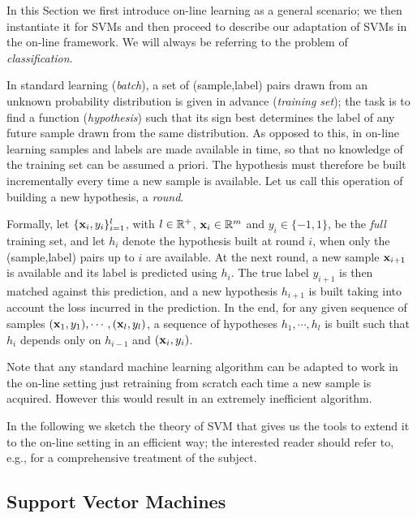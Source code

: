 In this Section we first introduce on-line learning as a general scenario; we then
instantiate it for SVMs and then proceed to describe our
adaptation of SVMs in the on-line framework. We will always be referring
to the problem of \emph{classification}.

In standard learning (\emph{batch}), a set of (sample,label) pairs drawn from an
unknown probability distribution is given in advance (\emph{training set}); the task
is to find a function (\emph{hypothesis}) such that its sign best determines the
label of any future sample drawn from the same distribution. As opposed to this,
in on-line learning samples and labels are made available in time, so that no
knowledge of the training set can be assumed a priori. The hypothesis must therefore
be built incrementally every time a new sample is available. Let us call this operation
of building a new hypothesis, a \emph{round}.

Formally, let $\{\mathbf{x}_i,y_i\}_{i=1}^l$, with $l \in \mathbb{R}^+$, $\mathbf{x}_i\in\mathbb{R}^m$ and
$y_i\in\{-1,1\}$, be the \emph{full} training set, and let $h_i$ denote the
hypothesis built at round $i$, when only the (sample,label) pairs up to $i$ are
available. At the next round, a new sample $\mathbf{x}_{i+1}$ is available and
its label is predicted using $h_i$.
The true label $y_{i+1}$ is then matched against this prediction, and a
new hypothesis $h_{i+1}$ is built taking into account the loss incurred in the
prediction. In the end, for any given sequence of samples $(\mathbf{x}_1,y_1),\cdots,(\mathbf{x}_l,y_l)$,
a sequence of hypotheses $h_1,\cdots,h_l$ is built such that $h_i$ depends
only on $h_{i-1}$ and $(\mathbf{x}_i,y_i)$.

Note that any standard machine learning algorithm can be adapted to work in the
on-line setting just retraining from scratch each time a new sample is acquired.
However this would result in an extremely inefficient algorithm.

In the following we sketch the theory of SVM that gives us the tools
to extend it to the on-line setting in an efficient way;
the interested reader should refer to, e.g., \cite{Cristianini00} for a
comprehensive treatment of the subject.


\subsection{Support Vector Machines}

